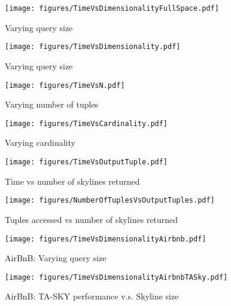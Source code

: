 \begin{figure*}[!ht]
  \begin{minipage}[t]{0.23\linewidth}
    \centering
    \texttt{[image: figures/TimeVsDimensionalityFullSpace.pdf]}
    \vspace{-6mm}
    \caption{Varying query size}
    \label{fig:algorithms}
  \end{minipage}
  \hspace{1mm}
  \begin{minipage}[t]{0.23\linewidth}
    \centering
    \texttt{[image: figures/TimeVsDimensionality.pdf]}
    \vspace{-6mm}
    \caption{Varying query size}
    \label{fig:syn_TimeVsDimension_Dist}
  \end{minipage}
  \hspace{3mm}
  \begin{minipage}[t]{0.23\linewidth}
    \centering
    \texttt{[image: figures/TimeVsN.pdf]}
    \vspace{-6mm}
    \caption{Varying number of tuples} 
    \label{fig:syn_TimeVsN}
  \end{minipage}
  \begin{minipage}[t]{0.25\linewidth}
    \centering
    \texttt{[image: figures/TimeVsCardinality.pdf]}
    \vspace{-2mm}
    \caption{Varying cardinality}
    \label{fig:syn_TimeVsC}
  \end{minipage}
\end{figure*}


\begin{figure*}[!ht]
  \begin{minipage}[t]{0.25\linewidth}
    \centering
    \texttt{[image: figures/TimeVsOutputTuple.pdf]}
    \caption{Time vs number of skylines returned}
    \label{fig:syn_TimeVsNumberOfSkylines}
  \end{minipage}
  \hspace{2mm}
  \begin{minipage}[t]{0.25\linewidth}
    \centering
    \texttt{[image: figures/NumberOfTuplesVsOutputTuples.pdf]}
    \caption{Tuples accessed vs number of skylines returned}
    \label{fig:syn_NumberOfTuplesVsSkylines}
  \end{minipage}
  \begin{minipage}[t]{0.21\linewidth}
    \centering
    \texttt{[image: figures/TimeVsDimensionalityAirbnb.pdf]}
    \caption{AirBnB: Varying query size}
    \label{fig:algorithmsAirbnb}
  \end{minipage}
  \hspace{1mm}
  \begin{minipage}[t]{0.23\linewidth}
    \centering
    \texttt{[image: figures/TimeVsDimensionalityAirbnbTASky.pdf]}
    \caption{AirBnB: TA-SKY performance v.s. Skyline size}
    \label{fig:Airbnbm}
  \end{minipage}
\end{figure*}

